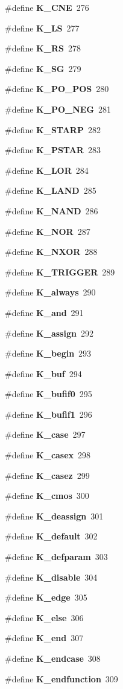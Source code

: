 \begin{CompactItemize}
\#define {\bf K\_\-CNE}\ 276
\item 
\#define {\bf K\_\-LS}\ 277
\item 
\#define {\bf K\_\-RS}\ 278
\item 
\#define {\bf K\_\-SG}\ 279
\item 
\#define {\bf K\_\-PO\_\-POS}\ 280
\item 
\#define {\bf K\_\-PO\_\-NEG}\ 281
\item 
\#define {\bf K\_\-STARP}\ 282
\item 
\#define {\bf K\_\-PSTAR}\ 283
\item 
\#define {\bf K\_\-LOR}\ 284
\item 
\#define {\bf K\_\-LAND}\ 285
\item 
\#define {\bf K\_\-NAND}\ 286
\item 
\#define {\bf K\_\-NOR}\ 287
\item 
\#define {\bf K\_\-NXOR}\ 288
\item 
\#define {\bf K\_\-TRIGGER}\ 289
\item 
\#define {\bf K\_\-always}\ 290
\item 
\#define {\bf K\_\-and}\ 291
\item 
\#define {\bf K\_\-assign}\ 292
\item 
\#define {\bf K\_\-begin}\ 293
\item 
\#define {\bf K\_\-buf}\ 294
\item 
\#define {\bf K\_\-bufif0}\ 295
\item 
\#define {\bf K\_\-bufif1}\ 296
\item 
\#define {\bf K\_\-case}\ 297
\item 
\#define {\bf K\_\-casex}\ 298
\item 
\#define {\bf K\_\-casez}\ 299
\item 
\#define {\bf K\_\-cmos}\ 300
\item 
\#define {\bf K\_\-deassign}\ 301
\item 
\#define {\bf K\_\-default}\ 302
\item 
\#define {\bf K\_\-defparam}\ 303
\item 
\#define {\bf K\_\-disable}\ 304
\item 
\#define {\bf K\_\-edge}\ 305
\item 
\#define {\bf K\_\-else}\ 306
\item 
\#define {\bf K\_\-end}\ 307
\item 
\#define {\bf K\_\-endcase}\ 308
\item 
\#define {\bf K\_\-endfunction}\ 309

\end{CompactItemize}
